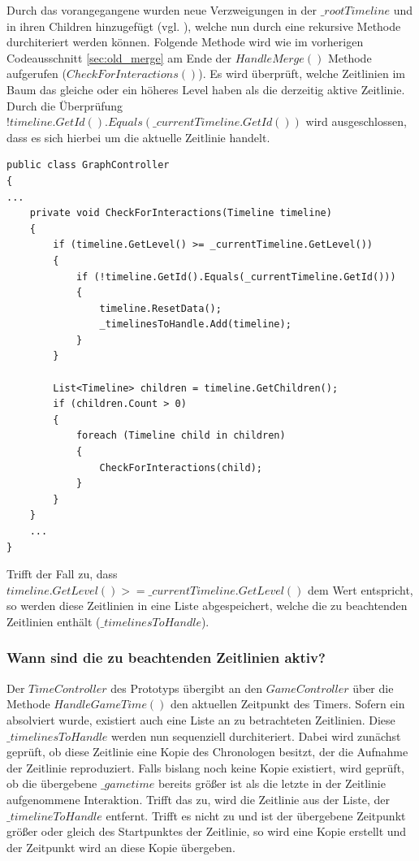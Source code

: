 Durch das vorangegangene  wurden neue Verzweigungen in der $\_rootTimeline$ und in ihren Children hinzugefügt (vgl. ), welche nun durch eine rekursive Methode durchiteriert werden können. Folgende Methode wird wie im vorherigen Codeausschnitt \ref{sec:old_merge} am Ende der $HandleMerge()$ Methode aufgerufen ($CheckForInteractions()$). Es wird überprüft, welche Zeitlinien im Baum das gleiche oder ein höheres Level haben als die derzeitig aktive Zeitlinie. Durch die Überprüfung $!timeline.GetId().Equals(\_currentTimeline.GetId())$ wird ausgeschlossen, dass es sich hierbei um die aktuelle Zeitlinie handelt.

\begin{lstlisting}[caption={HandleMerge Methode aus dem alten Prototyp}, label={sec:old_checkForInteractions}]
public class GraphController
{
...
    private void CheckForInteractions(Timeline timeline)
    {
        if (timeline.GetLevel() >= _currentTimeline.GetLevel())
        {
            if (!timeline.GetId().Equals(_currentTimeline.GetId()))
            {
                timeline.ResetData();
                _timelinesToHandle.Add(timeline);
            }
        }

        List<Timeline> children = timeline.GetChildren();
        if (children.Count > 0)
        {
            foreach (Timeline child in children)
            {
                CheckForInteractions(child);
            }
        }
    }
    ...
}
\end{lstlisting}

Trifft der Fall zu, dass $timeline.GetLevel() >= \_currentTimeline.GetLevel()$ dem Wert  entspricht, so werden diese Zeitlinien in eine Liste abgespeichert, welche die zu beachtenden Zeitlinien enthält ($\_timelinesToHandle$).

\subsubsection{Wann sind die zu beachtenden Zeitlinien aktiv?}\label{sec:good_03}
Der $TimeController$ des Prototyps übergibt an den $GameController$ über die Methode $HandleGameTime()$ den aktuellen Zeitpunkt des Timers. Sofern ein  absolviert wurde, existiert auch eine Liste an zu betrachteten Zeitlinien. Diese $\_timelinesToHandle$ werden nun sequenziell durchiteriert. Dabei wird zunächst geprüft, ob diese Zeitlinie eine Kopie des Chronologen besitzt, der die Aufnahme der Zeitlinie reproduziert. Falls bislang noch keine Kopie existiert, wird geprüft, ob die übergebene $\_gametime$ bereits größer ist als die letzte in der Zeitlinie aufgenommene Interaktion. Trifft das zu, wird die Zeitlinie aus der Liste, der $\_timelineToHandle$ entfernt. Trifft es nicht zu und ist der übergebene Zeitpunkt größer oder gleich des Startpunktes der Zeitlinie, so wird eine Kopie erstellt und der Zeitpunkt wird an diese Kopie übergeben.

